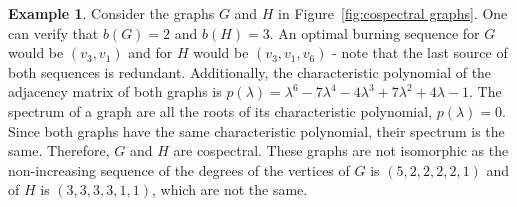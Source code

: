 \documentclass[12pt]{article}
\theoremstyle{plain}
\theoremstyle{definition}
\newtheorem{example}[theorem]{Example}
\theoremstyle{remark}
\begin{document}
\begin{example}
    Consider the graphs $G$ and $H$ in Figure~\ref{fig:cospectral graphs}. One can verify that $b(G)=2$ and $b(H)=3$. An optimal burning sequence for $G$ would be $(v_3,v_1)$ and for $H$ would be $(v_3,v_1,v_6)$ - note that the last source of both sequences is redundant.
Additionally, the characteristic polynomial of the adjacency matrix of both graphs is $p(\lambda) = \lambda^6-7\lambda^4-4\lambda^3+7\lambda^2+4\lambda-1$. The spectrum of a graph are all the roots of its characteristic polynomial, $p(\lambda)=0$. Since both graphs have the same characteristic polynomial, their spectrum is the same. Therefore, $G$ and $H$ are cospectral. These graphs are not isomorphic as the non-increasing sequence of the degrees of the vertices of $G$ is $(5,2,2,2,2,1)$ and of $H$ is $(3,3,3,3,1,1)$, which are not the same.
    \label{ex:cospectral graphs}
\end{example}
\end{document}
